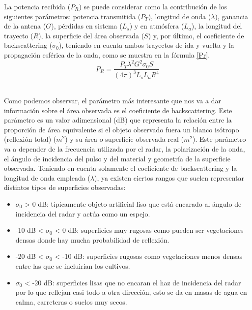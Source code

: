 \par La potencia recibida ($P_{R}$) se puede considerar como la contribución de los siguientes parámetros: potencia transmitida ($P_{T}$), longitud de onda ($\lambda$), ganancia de la antena ($G$), pérdidas en sistema ($L_{s}$) y en atmósfera ($L_{a}$), la longitud del trayecto ($R$), la superficie del área observada ($S$) y, por último, el coeficiente de backscattering ($\sigma_{0}$), teniendo en cuenta ambos trayectos de ida y vuelta y la propagación esférica de la onda, como se muestra en la fórmula \ref{Pr}. 
\\
\begin{equation} \label{Pr}
P_{R}=\frac{P_{T}\lambda ^{2}G^{2}\sigma_{0}S}{(4\pi ) ^{3}L_{s}L_{a}R^{4}}
\end{equation}
\\
\par Como podemos observar, el parámetro más interesante que nos va a dar información sobre el área observada es el coeficiente de backscattering. Este parámetro es un valor adimensional (dB) que representa la relación entre la proporción de área equivalente si el objeto observado fuera un blanco isótropo (reflexión total) ($m^{2}$) y su área o superficie observada real ($m^{2}$). Este parámetro va a depender de la frecuencia utilizada por el radar, la polarización de la onda, el ángulo de incidencia del pulso y del material y geometría de la superficie observada. Teniendo en cuenta solamente el coeficiente de backscattering y la longitud de onda empleada ($\lambda$), ya existen ciertos rangos que suelen representar distintos tipos de superficies observadas:
\begin{itemize}
	\item $\sigma_{0}$ > 0 dB: típicamente objeto artificial liso que está encarado al ángulo de incidencia del radar y actúa como un espejo.
	\item -10 dB < $\sigma_{0}$ < 0 dB: superficies muy rugosas como pueden ser vegetaciones densas donde hay mucha probabilidad de reflexión.
	\item -20 dB < $\sigma_{0}$ < -10 dB: superficies rugosas como vegetaciones menos densas entre las que se incluirían los cultivos. 
	\item $\sigma_{0}$ < -20 dB: superficies lisas que no encaran el haz de incidencia del radar por lo que reflejan casi todo a otra dirección, esto se da en masas de agua en calma, carreteras o suelos muy secos. 
\end{itemize}

